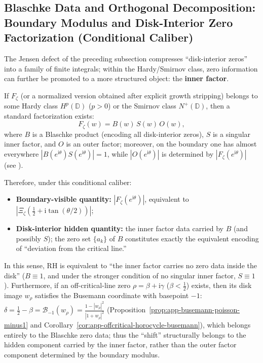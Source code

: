 \subsection{Blaschke Data and Orthogonal Decomposition: Boundary Modulus and Disk-Interior Zero Factorization (Conditional Caliber)}\label{subsec:unit-disk-inner-outer}
The Jensen defect of the preceding subsection compresses ``disk-interior zeros'' into a family of finite integrals; within the Hardy/Smirnov class, zero information can further be promoted to a more structured object: the \textbf{inner factor}.

\begin{remark}
If \(F_{\zeta}\) (or a normalized version obtained after explicit growth stripping) belongs to some Hardy class \(H^p(\mathbb{D})\) (\(p>0\)) or the Smirnov class \(N^+(\mathbb{D})\), then a standard factorization exists:
\[
F_{\zeta}(w)=B(w)\,S(w)\,O(w),
\]
where \(B\) is a Blaschke product (encoding all disk-interior zeros), \(S\) is a singular inner factor, and \(O\) is an outer factor; moreover, on the boundary one has almost everywhere \(|B(e^{\mathrm{i}\theta})S(e^{\mathrm{i}\theta})|=1\), while \(|O(e^{\mathrm{i}\theta})|\) is determined by \(|F_{\zeta}(e^{\mathrm{i}\theta})|\) (see \cite{Duren1970TheoryHp,Garnett2007BoundedAnalyticFunctions}).
\par
Therefore, under this conditional caliber:
\begin{itemize}
  \item \textbf{Boundary-visible quantity:} \(|F_{\zeta}(e^{\mathrm{i}\theta})|\), equivalent to \(|\Xi_{\zeta}(\tfrac12+\mathrm{i}\tan(\theta/2))|\);
  \item \textbf{Disk-interior hidden quantity:} the inner factor data carried by \(B\) (and possibly \(S\)); the zero set \(\{a_k\}\) of \(B\) constitutes exactly the equivalent encoding of ``deviation from the critical line.''
\end{itemize}
In this sense, RH is equivalent to ``the inner factor carries no zero data inside the disk'' (\(B\equiv 1\), and under the stronger condition of no singular inner factor, \(S\equiv 1\)).
Furthermore, if an off-critical-line zero \(\rho=\beta+\mathrm{i}\gamma\) (\(\beta<\tfrac12\)) exists, then its disk image \(w_{\rho}\) satisfies the Busemann coordinate with basepoint \(-1\):
\(
\delta=\tfrac12-\beta
=\mathcal{B}_{-1}(w_{\rho})=\frac{1-|w_{\rho}|^{2}}{|1+w_{\rho}|^{2}}
\)
(Proposition~\ref{prop:app-busemann-poisson-minus1} and Corollary~\ref{cor:app-offcritical-horocycle-busemann}), which belongs entirely to the Blaschke zero data;
thus the ``shift'' structurally belongs to the hidden component carried by the inner factor, rather than the outer factor component determined by the boundary modulus.
\end{remark}

